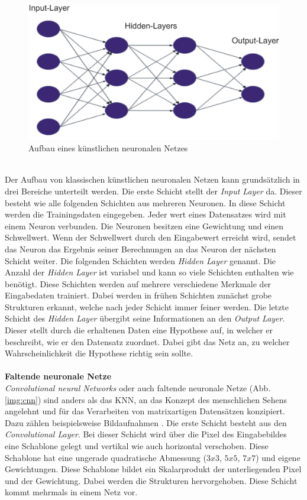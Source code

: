 \documentclass[a4paper,12pt,oneside]{article}
\begin{document}
\begin{figure}
	[h]
	\centering
	\includegraphics[scale=0.5]{Sources/nnet.png}
	\caption{Aufbau eines künstlichen neuronalen Netzes \cite{bistra2018pic}}
	\label{img:neuronales_netz}
\end{figure}\\
Der Aufbau von klassischen künstlichen neuronalen Netzen kann grundsätzlich in drei Bereiche unterteilt werden. Die erste Schicht stellt der \textit{Input Layer} da. Dieser besteht wie alle folgenden Schichten aus mehreren Neuronen. In diese Schicht werden die Trainingsdaten eingegeben. Jeder wert eines Datensatzes wird mit einem Neuron verbunden. Die Neuronen besitzen eine Gewichtung und einen Schwellwert. Wenn der Schwellwert durch den Eingabewert erreicht wird, sendet das Neuron das Ergebnis seiner Berechnungen an das Neuron der nächsten Schicht weiter. Die folgenden Schichten werden \textit{Hidden Layer} genannt. Die Anzahl der \textit{Hidden Layer} ist variabel und kann so viele Schichten enthalten wie benötigt. Diese Schichten werden auf mehrere verschiedene Merkmale der Eingabedaten trainiert. Dabei werden in frühen Schichten zunächst grobe Strukturen erkannt, welche nach jeder Schicht immer feiner werden. Die letzte Schicht des \textit{Hidden Layer} übergibt seine Informationen an den \textit{Output Layer}. Dieser stellt durch die erhaltenen Daten eine Hypothese auf, in welcher er beschreibt, wie er den Datensatz zuordnet. Dabei gibt das Netz an, zu welcher Wahrscheinlichkeit die Hypothese richtig sein sollte.\\\\
\textbf{Faltende neuronale Netze}\label{s.cnn}\\
\textit{Convolutional neural Networks} oder auch faltende neuronale Netze (Abb. \ref{img:cnn}) sind anders als das KNN, an das Konzept des menschlichen Sehens angelehnt \cite{sermanet2012convolutional} und für das Verarbeiten von matrixartigen Datensätzen konzipiert. Dazu zählen beispielsweise Bildaufnahmen \cite{goodfellow2016deep}. Die erste Schicht besteht aus den \textit{Convolutional Layer}. Bei dieser Schicht wird über die Pixel des Eingabebildes eine Schablone gelegt und vertikal wie auch horizontal verschoben. Diese Schablone hat eine ungerade quadratische Abmessung ($3x3$, $5x5$, $7x7$) und eigene Gewichtungen. Diese Schablone bildet ein Skalarprodukt der unterliegenden Pixel und der Gewichtung. Dabei werden die Strukturen hervorgehoben. Diese Schicht kommt mehrmals in einem Netz vor.\\  
\end{document}
